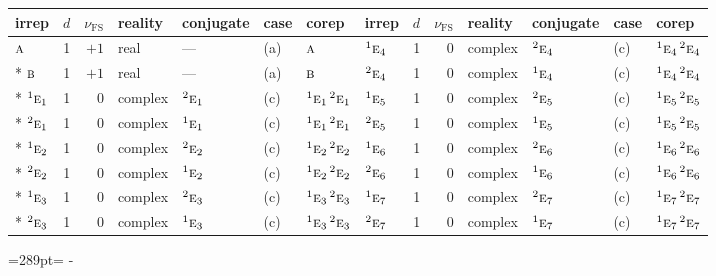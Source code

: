 \documentclass[10pt,a4paper]{article}
\newcommand{\needspace}[1]{\par\penalty-100\begingroup\dimen0=#1\relax\dimen2=\pagegoal
  \advance\dimen2-\pagetotal\ifdim\dimen0>\dimen2\relax\ifdim\dimen2>0pt\vfil\break\fi\fi
  \endgroup}
\numberwithin{equation}{section}
\newcommand{\irr}[1]{\text{\normalfont\scshape #1}}
\newcommand{\conjpair}[1]{{}^{#1}}
\newcommand{\fsind}{\nu_{\mathrm{FS}}}
\begin{document}
{\small\renewcommand{\arraystretch}{1.25}\setlength{\tabcolsep}{4pt}\begin{longtable}{@{}lrrllll@{\hspace{18pt}}lrrllll@{}}\toprule
irrep & $d$ & $\fsind$ & reality & conjugate & case & corep & irrep & $d$ & $\fsind$ & reality & conjugate & case & corep\\\midrule\endhead
\bottomrule\endfoot\endlastfoot
$\irr{a}$ & 1 & $+1$ & real & --- & (a) & $\irr{a}$ & $\conjpair{1}\irr{e}_{4}$ & 1 & $0$ & complex & $\conjpair{2}\irr{e}_{4}$ & (c) & $\conjpair{1}\irr{e}_{4}\,\conjpair{2}\irr{e}_{4}$\\*
$\irr{b}$ & 1 & $+1$ & real & --- & (a) & $\irr{b}$ & $\conjpair{2}\irr{e}_{4}$ & 1 & $0$ & complex & $\conjpair{1}\irr{e}_{4}$ & (c) & $\conjpair{1}\irr{e}_{4}\,\conjpair{2}\irr{e}_{4}$\\*
$\conjpair{1}\irr{e}_{1}$ & 1 & $0$ & complex & $\conjpair{2}\irr{e}_{1}$ & (c) & $\conjpair{1}\irr{e}_{1}\,\conjpair{2}\irr{e}_{1}$ & $\conjpair{1}\irr{e}_{5}$ & 1 & $0$ & complex & $\conjpair{2}\irr{e}_{5}$ & (c) & $\conjpair{1}\irr{e}_{5}\,\conjpair{2}\irr{e}_{5}$\\*
$\conjpair{2}\irr{e}_{1}$ & 1 & $0$ & complex & $\conjpair{1}\irr{e}_{1}$ & (c) & $\conjpair{1}\irr{e}_{1}\,\conjpair{2}\irr{e}_{1}$ & $\conjpair{2}\irr{e}_{5}$ & 1 & $0$ & complex & $\conjpair{1}\irr{e}_{5}$ & (c) & $\conjpair{1}\irr{e}_{5}\,\conjpair{2}\irr{e}_{5}$\\*
$\conjpair{1}\irr{e}_{2}$ & 1 & $0$ & complex & $\conjpair{2}\irr{e}_{2}$ & (c) & $\conjpair{1}\irr{e}_{2}\,\conjpair{2}\irr{e}_{2}$ & $\conjpair{1}\irr{e}_{6}$ & 1 & $0$ & complex & $\conjpair{2}\irr{e}_{6}$ & (c) & $\conjpair{1}\irr{e}_{6}\,\conjpair{2}\irr{e}_{6}$\\*
$\conjpair{2}\irr{e}_{2}$ & 1 & $0$ & complex & $\conjpair{1}\irr{e}_{2}$ & (c) & $\conjpair{1}\irr{e}_{2}\,\conjpair{2}\irr{e}_{2}$ & $\conjpair{2}\irr{e}_{6}$ & 1 & $0$ & complex & $\conjpair{1}\irr{e}_{6}$ & (c) & $\conjpair{1}\irr{e}_{6}\,\conjpair{2}\irr{e}_{6}$\\*
$\conjpair{1}\irr{e}_{3}$ & 1 & $0$ & complex & $\conjpair{2}\irr{e}_{3}$ & (c) & $\conjpair{1}\irr{e}_{3}\,\conjpair{2}\irr{e}_{3}$ & $\conjpair{1}\irr{e}_{7}$ & 1 & $0$ & complex & $\conjpair{2}\irr{e}_{7}$ & (c) & $\conjpair{1}\irr{e}_{7}\,\conjpair{2}\irr{e}_{7}$\\*
$\conjpair{2}\irr{e}_{3}$ & 1 & $0$ & complex & $\conjpair{1}\irr{e}_{3}$ & (c) & $\conjpair{1}\irr{e}_{3}\,\conjpair{2}\irr{e}_{3}$ & $\conjpair{2}\irr{e}_{7}$ & 1 & $0$ & complex & $\conjpair{1}\irr{e}_{7}$ & (c) & $\conjpair{1}\irr{e}_{7}\,\conjpair{2}\irr{e}_{7}$\\
\bottomrule\end{longtable}}
\needspace{289pt}
\end{document}
